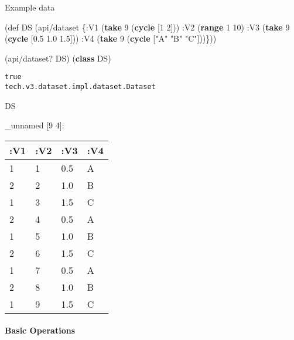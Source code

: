 \documentclass[]{article}
\newenvironment{Shaded}{\begin{snugshade}}{\end{snugshade}}
\newcommand{\AttributeTok}[1]{\textcolor[rgb]{0.77,0.63,0.00}{#1}}
\newcommand{\BuiltInTok}[1]{#1}
\newcommand{\DecValTok}[1]{\textcolor[rgb]{0.00,0.00,0.81}{#1}}
\newcommand{\FloatTok}[1]{\textcolor[rgb]{0.00,0.00,0.81}{#1}}
\newcommand{\FunctionTok}[1]{\textcolor[rgb]{0.00,0.00,0.00}{#1}}
\newcommand{\KeywordTok}[1]{\textcolor[rgb]{0.13,0.29,0.53}{\textbf{#1}}}
\newcommand{\NormalTok}[1]{#1}
\newcommand{\StringTok}[1]{\textcolor[rgb]{0.31,0.60,0.02}{#1}}
\let\oldparagraph\paragraph
\renewcommand{\paragraph}[1]{\oldparagraph{#1}\mbox{}}
\begin{document}
Example data

\begin{Shaded}
\begin{Highlighting}[]
\NormalTok{(}\BuiltInTok{def}\FunctionTok{ DS }\NormalTok{(api/dataset \{}\AttributeTok{:V1}\NormalTok{ (}\KeywordTok{take} \DecValTok{9}\NormalTok{ (}\KeywordTok{cycle}\NormalTok{ [}\DecValTok{1} \DecValTok{2}\NormalTok{]))}
                      \AttributeTok{:V2}\NormalTok{ (}\KeywordTok{range} \DecValTok{1} \DecValTok{10}\NormalTok{)}
                      \AttributeTok{:V3}\NormalTok{ (}\KeywordTok{take} \DecValTok{9}\NormalTok{ (}\KeywordTok{cycle}\NormalTok{ [}\FloatTok{0.5} \FloatTok{1.0} \FloatTok{1.5}\NormalTok{]))}
                      \AttributeTok{:V4}\NormalTok{ (}\KeywordTok{take} \DecValTok{9}\NormalTok{ (}\KeywordTok{cycle}\NormalTok{ [}\StringTok{"A"} \StringTok{"B"} \StringTok{"C"}\NormalTok{]))\}))}
\end{Highlighting}
\end{Shaded}

\begin{Shaded}
\begin{Highlighting}[]
\NormalTok{(api/dataset? DS)}
\NormalTok{(}\KeywordTok{class}\NormalTok{ DS)}
\end{Highlighting}
\end{Shaded}

\begin{verbatim}
true
tech.v3.dataset.impl.dataset.Dataset
\end{verbatim}

\begin{Shaded}
\begin{Highlighting}[]
\NormalTok{DS}
\end{Highlighting}
\end{Shaded}

\_unnamed {[}9 4{]}:

\begin{longtable}[]{@{}llll@{}}
\toprule
:V1 & :V2 & :V3 & :V4\tabularnewline
\midrule
\endhead
1 & 1 & 0.5 & A\tabularnewline
2 & 2 & 1.0 & B\tabularnewline
1 & 3 & 1.5 & C\tabularnewline
2 & 4 & 0.5 & A\tabularnewline
1 & 5 & 1.0 & B\tabularnewline
2 & 6 & 1.5 & C\tabularnewline
1 & 7 & 0.5 & A\tabularnewline
2 & 8 & 1.0 & B\tabularnewline
1 & 9 & 1.5 & C\tabularnewline
\bottomrule
\end{longtable}

\hypertarget{basic-operations}{%
\paragraph{Basic Operations}\label{basic-operations}}
\end{document}
